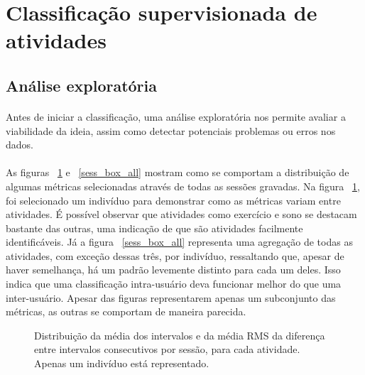         
    \section{Classificação supervisionada de atividades}
    \label{classif}
    
        \subsection{Análise exploratória}
        \label{anaexp}
            
            \paragraph{} Antes de iniciar a classificação, uma análise exploratória nos permite avaliar a viabilidade da ideia, assim como detectar potenciais problemas ou erros nos dados. 
            \paragraph{}As figuras ~\ref{sess_box_ronald} e ~\ref{sess_box_all} mostram como se comportam a distribuição de algumas métricas selecionadas através de todas as sessões gravadas. Na figura ~\ref{sess_box_ronald}, foi selecionado um indivíduo para demonstrar como as métricas variam entre atividades. É possível observar que atividades como exercício e sono se destacam bastante das outras, uma indicação de que são atividades facilmente identificáveis. Já a figura ~\ref{sess_box_all} representa uma agregação de todas as atividades, com exceção dessas três, por indivíduo, ressaltando que, apesar de haver semelhança, há um padrão levemente distinto para cada um deles. Isso indica que uma classificação intra-usuário deva funcionar melhor do que uma inter-usuário. Apesar das figuras representarem apenas um subconjunto das métricas, as outras se comportam de maneira parecida.
      
      
            \begin{figure}[h!]
                \centering
                \caption{Distribuição da média dos intervalos e da média RMS da diferença entre intervalos consecutivos por sessão, para cada atividade. Apenas um indivíduo está representado.}
                \label{sess_box_ronald}
            \end{figure}

